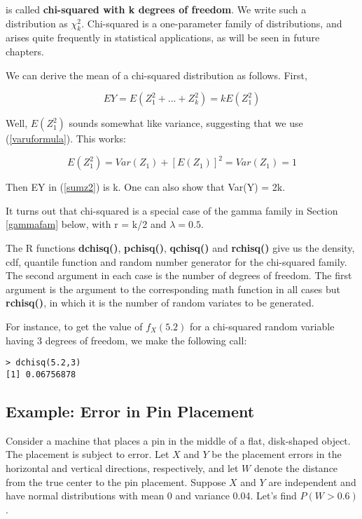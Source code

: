 is called {\bf chi-squared with k degrees of freedom}.  We write such a
distribution as $\chi_k^2$.  Chi-squared is a one-parameter family of
distributions, and arises quite frequently in statistical applications,
as will be seen in future chapters.

We can derive the mean of a chi-squared distribution as follows.  First,

\begin{equation}
EY = E(Z_1^2+...+Z_k^2) = k E(Z_1^2)
\end{equation}

Well, $E(Z_1^2)$ sounds somewhat like variance, suggesting that we use
(\ref{varuformula}).  This works:

\begin{equation}
E(Z_1^2) = Var(Z_1) +  [E(Z_1)]^2 = Var(Z_1) = 1
\end{equation}

Then EY in (\ref{sumz2}) is k.  One can also show that Var(Y) = 2k.

It turns out that chi-squared is a special case of the gamma family in
Section \ref{gammafam} below, with r = k/2 and $\lambda = 0.5$.

The R functions {\bf dchisq()}, {\bf pchisq()}, {\bf qchisq()} and {\bf
rchisq()} give us the density, cdf, quantile function and random number
generator for the chi-squared family.  The second argument in each case
is the number of degrees of freedom.  The first argument is the argument
to the corresponding math function in all cases but {\bf rchisq()}, in
which it is the number of random variates to be generated.

For instance, to get the value of $f_X(5.2)$ for a chi-squared random
variable having 3 degrees of freedom, we make the following call:

\begin{lstlisting}
> dchisq(5.2,3)
[1] 0.06756878
\end{lstlisting}

\subsection{Example:  Error in Pin Placement}

Consider a machine that places a pin in the middle of a flat,
disk-shaped object. The placement is subject to error. Let $X$ and $Y$ be
the placement errors in the horizontal and vertical directions,
respectively, and let $W$ denote the distance from the true center to the
pin placement. Suppose $X$ and $Y$ are independent and have normal
distributions with mean 0 and variance 0.04. Let's find $P(W > 0.6)$. 

